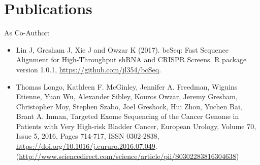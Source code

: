 \documentclass[11pt]{article}
\begin{document}

%


\section*{Publications}
%
As Co-Author:
\begin{itemize}

  \item Lin J, Gresham J, Xie J and Owzar K (2017). bcSeq: Fast Sequence
  Alignment for High-Throughput shRNA and CRISPR Screens. R package version
  1.0.1, \href{https://github.com/jl354/bcSeq}{https://github.com/jl354/bcSeq}.

  \item Thomas Longo, Kathleen F. McGinley, Jennifer A. Freedman,
  Wiguins Etienne, Yuan Wu, Alexander Sibley, Kouros Owzar, Jeremy Gresham,
  Christopher Moy, Stephen Szabo, Joel Greshock, Hui Zhou, Yuchen Bai,
  Brant A. Inman, Targeted Exome Sequencing of the Cancer Genome in Patients
  with Very High-risk Bladder Cancer, European Urology, Volume 70, Issue 5,
   2016, Pages 714-717, ISSN 0302-2838,
   \href{https://doi.org/10.1016/j.eururo.2016.07.049}{https://doi.org/10.1016/j.eururo.2016.07.049}.
(\href{http://www.sciencedirect.com/science/article/pii/S0302283816304638}{http://www.sciencedirect.com/science/article/pii/S0302283816304638})
%
%


\end{itemize}
\end{document}
